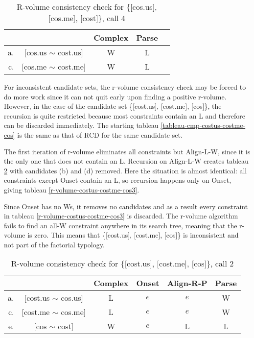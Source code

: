 \documentclass[11pt]{article}
\begin{document}
\begin{table}
\begin{tabular}{|rc||c|c|c|}\hline
 && {\sc *Complex} & {\sc Parse} \\ \hline\hline
 a. & [cos.us $\sim$ cost.us] & W & L\\ \hline
 c. & [cos.me $\sim$ cost.me] & W& L\\ \hline
\end{tabular}
  \caption{R-volume consistency check for \{[cos.us], [cos.me], [cost]\}, call 4}
  \label{r-volume-cosus-cosme-cost4}
\end{table}

For inconsistent candidate sets, the r-volume consistency check may be
forced to do more work since it can not quit early upon finding a
positive r-volume. However, in the case of the candidate set
\{[cost.us], [cost.me], [cos]\}, the recursion is quite
restricted because most constraints contain an L and therefore can be
discarded immediately. The starting tableau
\ref{tableau-cmp-costus-costme-cos} is the same as that of RCD for the
same candidate set.

 The first iteration of r-volume eliminates all constraints but {\sc
   Align-L-W}, since it is the only one that does not contain an
 L. Recursion on {\sc Align-L-W} creates tableau
 \ref{r-volume-costus-costme-cos2} with candidates (b) and (d)
 removed. Here the situation is almost identical: all constraints
 except {\sc Onset} contain an L, so recursion happens only on {\sc
   Onset}, giving tableau \ref{r-volume-costus-costme-cos3}.

 Since {\sc Onset} has no Ws, it removes no candidates and as a result
 every constraint in tableau \ref{r-volume-costus-costme-cos3} is
 discarded. The r-volume algorithm fails to find an all-W constraint
 anywhere in its search tree, meaning that the r-volume is zero. This means that
 \{[cost.us], [cost.me], [cos]\} is inconsistent and not part of the
 factorial typology.

\begin{table}
\begin{tabular}{|rc||c|c|c|c|}\hline
 && {\sc *Complex} & {\sc Onset} & {\sc Align-R-P} & {\sc Parse} \\ \hline\hline
 a. & [cost.us $\sim$ cos.us] & L & $e$ &$e$  & W\\ \hline
 c. & [cost.me $\sim$ cos.me] &L &$e$ & $e$& W\\ \hline
 e. & [cos $\sim$ cost]         & W & $e$ & L    & L \\ \hline
\end{tabular}
  \caption{R-volume consistency check for \{[cost.us], [cost.me],
    [cos]\}, call 2}
  \label{r-volume-costus-costme-cos2}
\end{table}
\end{document}
